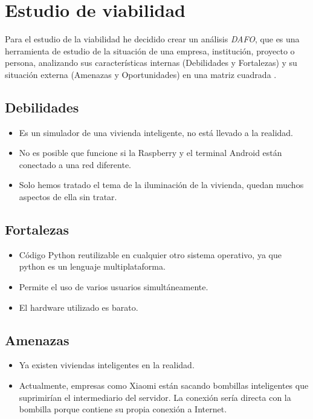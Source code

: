 \section{Estudio de viabilidad}

Para el estudio de la viabilidad he decidido crear un análisis \textit{DAFO}, que es una herramienta de estudio de la situación de una empresa, institución, proyecto o persona, analizando sus características internas (Debilidades y Fortalezas) y su situación externa (Amenazas y Oportunidades) en una matriz cuadrada \cite{wiki:dafo}.

\subsection{Debilidades}

\begin{itemize}
	\item Es un simulador de una vivienda inteligente, no está llevado a la realidad.
	\item No es posible que funcione si la Raspberry y el terminal Android están conectado a una red diferente.
	\item Solo hemos tratado el tema de la iluminación de la vivienda, quedan muchos aspectos de ella sin tratar.
\end{itemize}

\subsection{Fortalezas}

\begin{itemize}
	\item Código Python reutilizable en cualquier otro sistema operativo, ya que python es un lenguaje multiplataforma.
	\item Permite el uso de varios usuarios simultáneamente.
	\item El hardware utilizado es barato.
\end{itemize}

\subsection{Amenazas}

\begin{itemize}
	\item Ya existen viviendas inteligentes en la realidad.
	\item Actualmente, empresas como Xiaomi están sacando bombillas inteligentes que suprimirían el intermediario del servidor. La conexión sería directa con la bombilla porque contiene su propia conexión a Internet.
\end{itemize}

